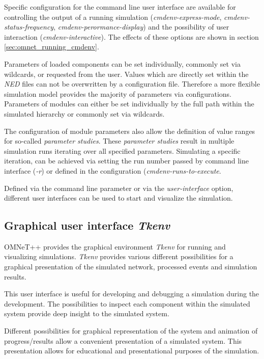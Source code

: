 Specific configuration for the command line user interface are available for controlling the output of a running simulation (\emph{cmdenv-express-mode}, \emph{cmdenv-status-frequency}, \emph{cmdenv-perormance-display}) and the possibility of user interaction (\emph{cmdenv-interactive}).
The effects of these options are shown in section \ref{sec:omnet_running_cmdenv}.

Parameters of loaded components can be set individually, commonly set via wildcards, or requested from the user.
Values which are directly set within the \emph{NED} files can not be overwritten by a configuration file.
Therefore a more flexible simulation model provides the majority of parameters via configurations.
Parameters of modules can either be set individually by the full path within the simulated hierarchy or commonly set via wildcards. \cite[section 9.3]{omnet_manual}

The configuration of module parameters also allow the definition of value ranges for so-called \emph{parameter studies}.
These \emph{parameter studies} result in multiple simulation runs iterating over all specified parameters.
Simulating a specific iteration, can be achieved via setting the run number passed by command line interface (\emph{-r}) or defined in the configuration (\emph{cmdenv-runs-to-execute}. \cite[section 9.4]{omnet_manual}

Defined via the command line parameter or via the \emph{user-interface} option, different user interfaces can be used to start and visualize the simulation.

\subsection{Graphical user interface \emph{Tkenv}}
\label{sec:omnet_running_tkenv}
OMNeT++ provides the graphical environment \emph{Tkenv} for running and visualizing simulations.
\emph{Tkenv} provides various different possibilities for a graphical presentation of the simulated network, processed events and simulation results.

This user interface is useful for developing and debugging a simulation during the development.
The possibilities to inspect each component within the simulated system provide deep insight to the simulated system.

Different possibilities for graphical representation of the system and animation of progress/results allow a convenient presentation of a simulated system.
This presentation allows for educational and presentational purposes of the simulation. \cite[section 7.1]{omnet_user_guide}

